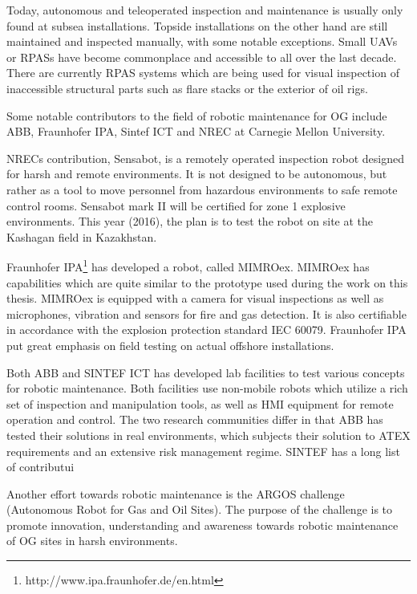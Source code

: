 Today, autonomous and teleoperated inspection and maintenance is usually only found at subsea installations. Topside installations on the other hand are still maintained and inspected manually, with some notable exceptions. Small \acp{UAV} or \acp{RPAS} have become commonplace and accessible to all over the last decade. There are currently \ac{RPAS} systems which are being used for visual inspection of inaccessible structural parts such as flare stacks or the exterior of oil rigs.

Some notable contributors to the field of robotic maintenance for \ac{OG} include ABB, \ac{Fraunhofer IPA}, Sintef ICT\cite{sintef_robot_consept} and NREC  at  Carnegie
Mellon University. 

NRECs contribution, Sensabot, is a remotely operated inspection robot designed for harsh and remote environments\cite{deploymentsensabot}. It is not designed to be autonomous, but rather as a tool to move personnel from hazardous environments to safe remote control rooms. Sensabot mark II will be certified for zone 1 explosive environments. This year (2016), the plan is to test the robot on site at the Kashagan field in Kazakhstan\cite{peerless2016robot}.

\ac{Fraunhofer IPA}\footnote{http://www.ipa.fraunhofer.de/en.html} has developed a robot, called \ac{MIMROex}. \ac{MIMROex} has capabilities which are quite similar to the prototype used during the work on this thesis. \ac{MIMROex} is equipped with a camera for visual inspections as well as microphones, vibration and sensors for fire and gas detection. It is also certifiable in accordance with the explosion protection standard IEC 60079\cite{MIMROex}. \ac{Fraunhofer IPA} put great emphasis on field testing on actual offshore installations.

Both ABB and SINTEF ICT has developed lab facilities to test various concepts for robotic maintenance. Both facilities use non-mobile robots which utilize a rich set of inspection and manipulation tools, as well as \ac{HMI} equipment for remote operation and control. The two research communities differ in that ABB has tested their solutions in real environments, which subjects their solution to ATEX requirements and an extensive risk management regime\cite{StepwiseApproachToRobotics}. SINTEF has a long list of contributui

Another effort towards robotic maintenance is the ARGOS challenge (Autonomous Robot for Gas and Oil Sites). The purpose of the challenge is to promote innovation, understanding and awareness towards robotic maintenance of \ac{OG} sites in harsh environments\cite{ARGOS}\cite{AutonomousOG}.